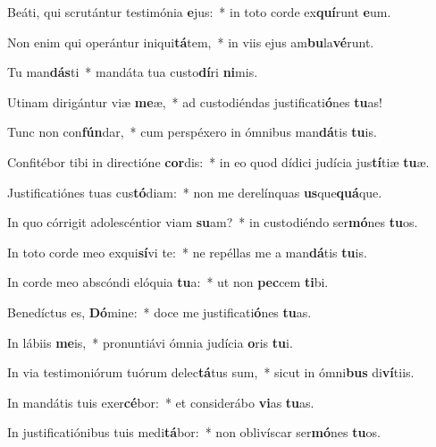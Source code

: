 \item Beáti, qui scrutántur testimónia \textbf{e}jus:~* in toto corde ex\textbf{quí}runt \textbf{e}um.
\item Non enim qui operántur iniqui\textbf{tá}tem,~* in viis ejus am\textbf{bu}la\textbf{vé}runt.
\item Tu man\textbf{dás}ti~* mandáta tua custo\textbf{dí}ri \textbf{ni}mis.
\item Utinam dirigántur viæ \textbf{me}æ,~* ad custodiéndas justificati\textbf{ó}nes \textbf{tu}as!
\item Tunc non con\textbf{fún}dar,~* cum perspéxero in ómnibus man\textbf{dá}tis \textbf{tu}is.
\item Confitébor tibi in directióne \textbf{cor}dis:~* in eo quod dídici judícia jus\textbf{tí}tiæ \textbf{tu}æ.
\item Justificatiónes tuas cus\textbf{tó}diam:~* non me derelínquas \textbf{us}que\textbf{quá}que.
\item In quo córrigit adolescéntior viam \textbf{su}am?~* in custodiéndo ser\textbf{mó}nes \textbf{tu}os.
\item In toto corde meo exqui\textbf{sí}vi te:~* ne repéllas me a man\textbf{dá}tis \textbf{tu}is.
\item In corde meo abscóndi elóquia \textbf{tu}a:~* ut non \textbf{pec}cem \textbf{ti}bi.
\item Benedíctus es, \textbf{Dó}mine:~* doce me justificati\textbf{ó}nes \textbf{tu}as.
\item In lábiis \textbf{me}is,~* pronuntiávi ómnia judícia \textbf{o}ris \textbf{tu}i.
\item In via testimoniórum tuórum delec\textbf{tá}tus sum,~* sicut in ómni\textbf{bus} di\textbf{ví}tiis.
\item In mandátis tuis exer\textbf{cé}bor:~* et considerábo \textbf{vi}as \textbf{tu}as.
\item In justificatiónibus tuis medi\textbf{tá}bor:~* non oblivíscar ser\textbf{mó}nes \textbf{tu}os.
